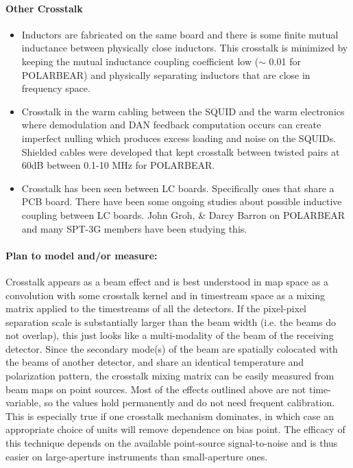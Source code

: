 \paragraph{Other Crosstalk}
\begin{itemize}
\item Inductors are fabricated on the same board and there is some finite mutual inductance between physically close inductors. This crosstalk is minimized by keeping the mutual inductance coupling coefficient low ($\sim$ 0.01 for POLARBEAR) and physically separating inductors that are close in frequency space. 
\item Crosstalk in the warm cabling between the SQUID and the warm electronics where demodulation and DAN feedback computation occurs can create imperfect nulling which produces excess loading and noise on the SQUIDs. Shielded cables were developed that kept crosstalk between twisted pairs at 60dB between 0.1-10 MHz for POLARBEAR.
\item Crosstalk has been seen between LC boards. Specifically ones that share a PCB board. There have been some ongoing studies about possible inductive coupling between LC boards. John Groh, \& Darcy Barron on POLARBEAR and many SPT-3G members have been studying this.
\end{itemize}

\paragraph{Plan to model and/or measure:}

Crosstalk appears as a beam effect and is best understood in map space as a convolution with some crosstalk kernel and in timestream space as a mixing matrix applied to the timestreams of all the detectors.
If the pixel-pixel separation scale is substantially larger than the beam width (i.e. the beams do not overlap), this just looks like a multi-modality of the beam of the receiving detector.
Since the secondary mode(s) of the beam are spatially colocated with the beams of another detector, and share an identical temperature and polarization pattern, the crosstalk mixing matrix can be easily measured from beam maps on point sources.
Most of the effects outlined above are not time-variable, so the values hold permanently and do not need frequent calibration.
This is especially true if one crosstalk mechanism dominates, in which case an appropriate choice of units will remove dependence on bias point.
The efficacy of this technique depends on the available point-source signal-to-noise and is thus easier on large-aperture instruments than small-aperture ones.

